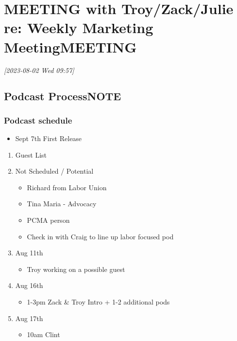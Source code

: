 \documentclass[11pt]{article}
\author{Tyler}
\date{\today}
\title{}
\begin{document}
\tableofcontents

\section{{\bfseries\sffamily MEETING} with Troy/Zack/Julie re: Weekly Marketing Meeting\hfill{}\textsc{MEETING}}
\label{sec:orgabd0991}
\textit{[2023-08-02 Wed 09:57]}

\subsection{Podcast Process\hfill{}\textsc{NOTE}}
\label{sec:org3f05599}

\subsubsection{Podcast schedule}
\label{sec:orgd4aac01}
\begin{itemize}
\item Sept 7th First Release
\end{itemize}
\begin{enumerate}
\item Guest List
\label{sec:org3a06a67}
\item Not Scheduled / Potential
\label{sec:org233d840}
\begin{itemize}
\item Richard from Labor Union
\item Tina Maria - Advocacy
\item PCMA person
\item Check in with Craig to line up labor focused pod
\end{itemize}
\item Aug 11th
\label{sec:orgc54efc6}
\begin{itemize}
\item Troy working on a possible guest
\end{itemize}
\item Aug 16th
\label{sec:org8cc77e3}
\begin{itemize}
\item 1-3pm Zack \& Troy Intro + 1-2 additional pods
\end{itemize}

\item Aug 17th
\label{sec:orgc784f01}
\begin{itemize}
\item 10am Clint
\end{itemize}
\end{enumerate}
\end{document}
